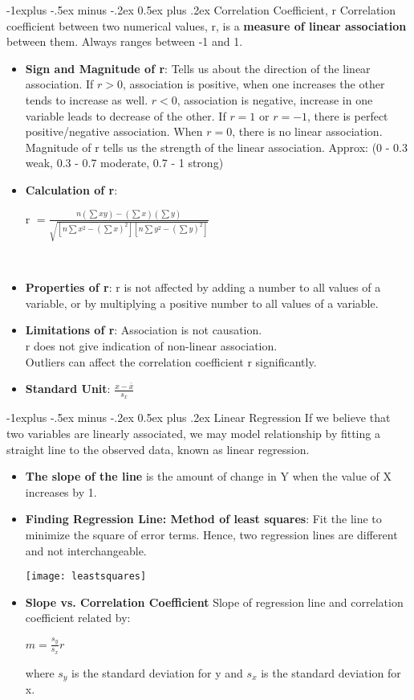 \documentclass[10pt, landscape]{article}
\makeatletter
\renewcommand{\subsection}{\@startsection{subsection}{2}{0mm}%
                                {-1explus -.5ex minus -.2ex}%
                                {0.5ex plus .2ex}%
                                {\normalfont\normalsize\bfseries}}
\makeatother
\begin{document}
\begin{multicols*}{4}
\subsection{Correlation Coefficient, r}
	Correlation coefficient between two numerical values, r, is a \textbf{measure of linear association} between them. Always ranges between -1 and 1.
\begin{itemize}
	\item \textbf{Sign and Magnitude of r}: Tells us about the direction of the linear association. If $r>0$, association is positive, when one increases the other tends to increase as well. $r<0$, association is negative, increase in one variable leads to decrease of the other. If $r=1$ or $r=-1$, there is perfect positive/negative association. When $r=0$, there is no linear association. Magnitude of r tells us the strength of the linear association. Approx: (0 - 0.3 weak, 0.3 - 0.7 moderate, 0.7 - 1 strong)
	\item \textbf{Calculation of r}: \\
	\centerline{\large r $= \frac{n(\sum xy) - (\sum x)(\sum y)}{\sqrt{[n \sum x^2  - (\sum x)^2][n \sum y^2 - (\sum y)^2] }} $ } ~\\
	\item \textbf{Properties of r}: r is not affected by adding a number to all values of a variable, or by multiplying a positive number to all values of a variable.
	\item \textbf{Limitations of r}: Association is not causation. \\
	r does not give indication of non-linear association. \\
	Outliers can affect the correlation coefficient r significantly. \\
        \item \textbf{Standard Unit}: $\frac{x - \bar x}{s_x}$
\end{itemize}

\subsection{Linear Regression}
If we believe that two variables are linearly associated, we may model relationship by fitting a straight line to the observed data, known as linear regression.
\begin{itemize}
	\item \textbf{The slope of the line} is the amount of change in Y when the value of X increases by 1.
	\item \textbf{Finding Regression Line: Method of least squares}: Fit the line to minimize the square of error terms. Hence, two regression lines are different and not interchangeable.
	\begin{center}\texttt{[image: leastsquares]}\end{center}
	\item \textbf{Slope vs. Correlation Coefficient} Slope of regression line and correlation coefficient related by: \\
	\centerline{ \large $ m = \frac{s_y}{s_x} r $ }
	where $s_y$ is the standard deviation for y and $s_x$ is the standard deviation for x.
	

\end{itemize}
\end{multicols*}
\end{document}
